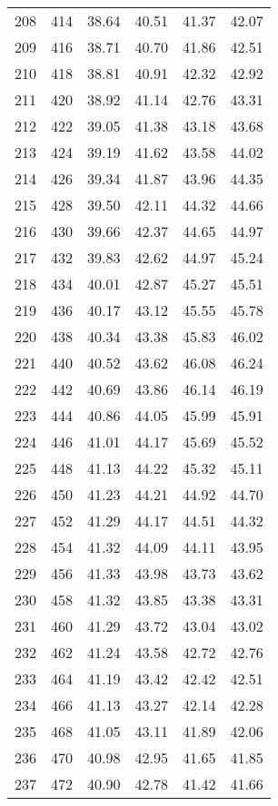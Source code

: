 \begin{longtable}{rrllll}
		208 & 414 & 38.64 & 40.51 & 41.37 & 42.07 \\ 
		209 & 416 & 38.71 & 40.70 & 41.86 & 42.51 \\ 
		210 & 418 & 38.81 & 40.91 & 42.32 & 42.92 \\ 
		211 & 420 & 38.92 & 41.14 & 42.76 & 43.31 \\ 
		212 & 422 & 39.05 & 41.38 & 43.18 & 43.68 \\ 
		213 & 424 & 39.19 & 41.62 & 43.58 & 44.02 \\ 
		214 & 426 & 39.34 & 41.87 & 43.96 & 44.35 \\ 
		215 & 428 & 39.50 & 42.11 & 44.32 & 44.66 \\ 
		216 & 430 & 39.66 & 42.37 & 44.65 & 44.97 \\ 
		217 & 432 & 39.83 & 42.62 & 44.97 & 45.24 \\ 
		218 & 434 & 40.01 & 42.87 & 45.27 & 45.51 \\ 
		219 & 436 & 40.17 & 43.12 & 45.55 & 45.78 \\ 
		220 & 438 & 40.34 & 43.38 & 45.83 & 46.02 \\ 
		221 & 440 & 40.52 & 43.62 & 46.08 & 46.24 \\ 
		222 & 442 & 40.69 & 43.86 & 46.14 & 46.19 \\ 
		223 & 444 & 40.86 & 44.05 & 45.99 & 45.91 \\ 
		224 & 446 & 41.01 & 44.17 & 45.69 & 45.52 \\ 
		225 & 448 & 41.13 & 44.22 & 45.32 & 45.11 \\ 
		226 & 450 & 41.23 & 44.21 & 44.92 & 44.70 \\ 
		227 & 452 & 41.29 & 44.17 & 44.51 & 44.32 \\ 
		228 & 454 & 41.32 & 44.09 & 44.11 & 43.95 \\ 
		229 & 456 & 41.33 & 43.98 & 43.73 & 43.62 \\ 
		230 & 458 & 41.32 & 43.85 & 43.38 & 43.31 \\ 
		231 & 460 & 41.29 & 43.72 & 43.04 & 43.02 \\ 
		232 & 462 & 41.24 & 43.58 & 42.72 & 42.76 \\ 
		233 & 464 & 41.19 & 43.42 & 42.42 & 42.51 \\ 
		234 & 466 & 41.13 & 43.27 & 42.14 & 42.28 \\ 
		235 & 468 & 41.05 & 43.11 & 41.89 & 42.06 \\ 
		236 & 470 & 40.98 & 42.95 & 41.65 & 41.85 \\ 
		237 & 472 & 40.90 & 42.78 & 41.42 & 41.66 \\ 

\end{longtable}
